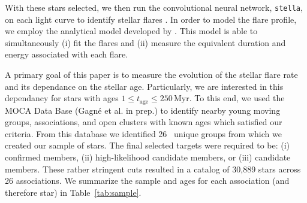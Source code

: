 \documentclass[twocolumn]{aastex631}
\begin{document}
With these stars selected, we then run the convolutional neural network, \texttt{stella}, on each light curve to identify stellar flares \citep{stella_joss}. In order to model the flare profile, we employ the analytical  model developed by \cite{tovar22}. This model is able to simultaneously (i) fit the flares and  (ii) measure the equivalent duration and energy associated with each flare.

A primary goal of this paper is to  measure the evolution of the stellar flare rate and its dependance on the stellar age. Particularly, we are interested in this dependancy for
stars with ages $1 \leq t_\textrm{age} \leq 250$\,Myr. To this end, we used the MOCA Data Base
(Gagné et al. in prep.) to identify nearby young moving groups, associations,
and open clusters with known ages which satisfied our criteria. From this database we identified
 26~ unique groups from which we created our  sample of stars. The final selected targets were required to be: (i) confirmed members, (ii) high-likelihood candidate members, or (iii) candidate members. These rather stringent cuts resulted in a
 catalog of 30,889 stars across 26 associations. We summarize
the sample and   ages for each association (and therefore star)
in Table~\ref{tab:sample}.
\end{document}
